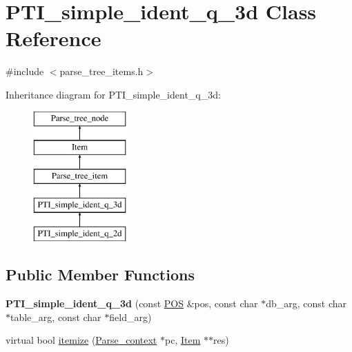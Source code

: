 \hypertarget{classPTI__simple__ident__q__3d}{}\section{P\+T\+I\+\_\+simple\+\_\+ident\+\_\+q\+\_\+3d Class Reference}
\label{classPTI__simple__ident__q__3d}


{\ttfamily \#include $<$parse\+\_\+tree\+\_\+items.\+h$>$}

Inheritance diagram for P\+T\+I\+\_\+simple\+\_\+ident\+\_\+q\+\_\+3d\+:\begin{figure}[H]
\begin{center}
\leavevmode
\includegraphics[height=5.000000cm]{classPTI__simple__ident__q__3d}
\end{center}
\end{figure}
\subsection*{Public Member Functions}
\begin{DoxyCompactItemize}
\item 
\mbox{\label{classPTI__simple__ident__q__3d_ad8e2652cb426a1c6c29033b439044801}} 
{\bfseries P\+T\+I\+\_\+simple\+\_\+ident\+\_\+q\+\_\+3d} (const \mbox{\hyperlink{structYYLTYPE}{P\+OS}} \&pos, const char $\ast$db\+\_\+arg, const char $\ast$table\+\_\+arg, const char $\ast$field\+\_\+arg)
\item 
virtual bool \mbox{\hyperlink{classPTI__simple__ident__q__3d_ad94d0e373c6cb86832c3206b706eaf0b}{itemize}} (\mbox{\hyperlink{structParse__context}{Parse\+\_\+context}} $\ast$pc, \mbox{\hyperlink{classItem}{Item}} $\ast$$\ast$res)
\end{DoxyCompactItemize}

